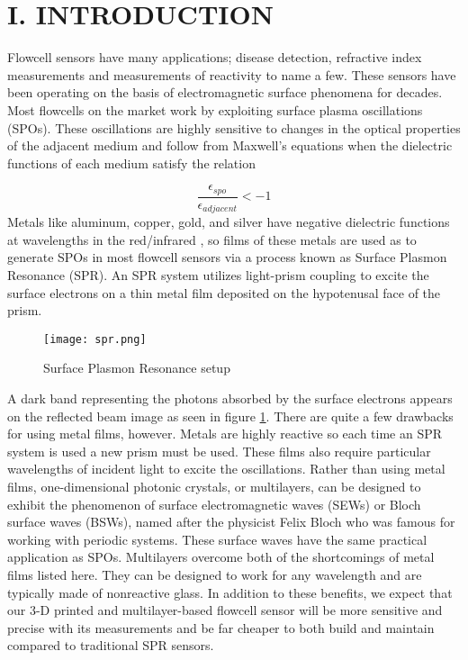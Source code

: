 \selectfont
{}
\section*{I. INTRODUCTION}
\begin{flushleft}
	\hspace{0.25in}
	Flowcell sensors have many applications; disease detection, refractive index measurements and measurements of reactivity to name a few. These sensors have been operating on the basis of electromagnetic surface phenomena for decades. Most flowcells on the market work by exploiting surface plasma oscillations (SPOs). These oscillations are highly sensitive to changes in the optical properties of the adjacent medium and follow from Maxwell's equations when the dielectric functions of each medium satisfy the relation \cite{JLTROB:1}
	
	\[
    	\frac{\epsilon_{spo}}{\epsilon_{adjacent}} < -1
	\]
	\hspace{0.25in}
	Metals like aluminum, copper, gold, and silver have negative dielectric functions at wavelengths in the red/infrared \cite{}, so films of these metals are used as to generate SPOs in most flowcell sensors via a process known as Surface Plasmon Resonance (SPR). An SPR system utilizes light-prism coupling to excite the surface electrons on a thin metal film deposited on the hypotenusal face of the prism. 
	\begin{figure}[h]
		\begin{center}
		\texttt{[image: spr.png]}
		\caption{Surface Plasmon Resonance setup}
		\label{fig:SPR}
		\end{center}
	\end{figure}
	A dark band representing the photons absorbed by the surface electrons appears on the reflected beam image as seen in figure \ref{fig:SPR}. There are quite a few drawbacks for using metal films, however. Metals are highly reactive so each time an SPR system is used a new prism must be used. These films also require particular wavelengths of incident light to excite the oscillations. Rather than using metal films, one-dimensional photonic crystals, or multilayers, can be designed to exhibit the phenomenon of surface electromagnetic waves (SEWs) or Bloch surface waves (BSWs), named after the physicist Felix Bloch who was famous for working with periodic systems. These surface waves have the same practical application as SPOs. Multilayers overcome both of the shortcomings of metal films listed here. They can be designed to work for any wavelength and are typically made of nonreactive glass. In addition to these benefits, we expect that our 3-D printed and multilayer-based flowcell sensor will be more sensitive and precise with its measurements and be far cheaper to both build and maintain compared to traditional SPR sensors.


\end{flushleft}

